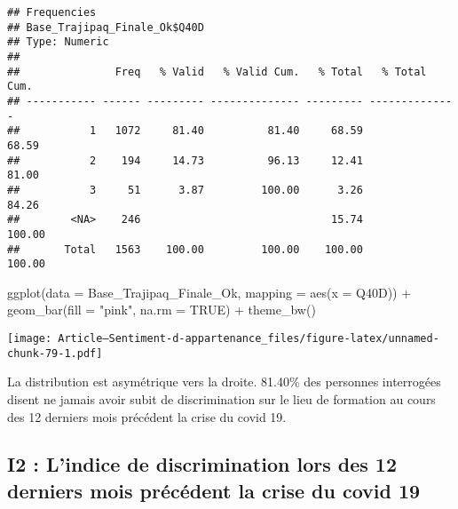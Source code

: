 \documentclass[
]{article}
\newenvironment{Shaded}{\begin{snugshade}}{\end{snugshade}}
\newcommand{\AttributeTok}[1]{\textcolor[rgb]{0.77,0.63,0.00}{#1}}
\newcommand{\ConstantTok}[1]{\textcolor[rgb]{0.00,0.00,0.00}{#1}}
\newcommand{\FunctionTok}[1]{\textcolor[rgb]{0.00,0.00,0.00}{#1}}
\newcommand{\NormalTok}[1]{#1}
\newcommand{\SpecialCharTok}[1]{\textcolor[rgb]{0.00,0.00,0.00}{#1}}
\newcommand{\StringTok}[1]{\textcolor[rgb]{0.31,0.60,0.02}{#1}}
\begin{document}
\begin{Shaded}
\end{Shaded}

\begin{verbatim}
## Frequencies  
## Base_Trajipaq_Finale_Ok$Q40D  
## Type: Numeric  
## 
##               Freq   % Valid   % Valid Cum.   % Total   % Total Cum.
## ----------- ------ --------- -------------- --------- --------------
##           1   1072     81.40          81.40     68.59          68.59
##           2    194     14.73          96.13     12.41          81.00
##           3     51      3.87         100.00      3.26          84.26
##        <NA>    246                              15.74         100.00
##       Total   1563    100.00         100.00    100.00         100.00
\end{verbatim}

\begin{Shaded}
\begin{Highlighting}[]
\FunctionTok{ggplot}\NormalTok{(}\AttributeTok{data =}\NormalTok{ Base\_Trajipaq\_Finale\_Ok, }\AttributeTok{mapping =} \FunctionTok{aes}\NormalTok{(}\AttributeTok{x =}\NormalTok{ Q40D)) }\SpecialCharTok{+}
  \FunctionTok{geom\_bar}\NormalTok{(}\AttributeTok{fill =} \StringTok{"pink"}\NormalTok{, }\AttributeTok{na.rm =} \ConstantTok{TRUE}\NormalTok{) }\SpecialCharTok{+}
  \FunctionTok{theme\_bw}\NormalTok{()}
\end{Highlighting}
\end{Shaded}

\texttt{[image: Article---Sentiment-d-appartenance\_files/figure-latex/unnamed-chunk-79-1.pdf]}

La distribution est asymétrique vers la droite. 81.40\% des personnes
interrogées disent ne jamais avoir subit de discrimination sur le lieu
de formation au cours des 12 derniers mois précédent la crise du covid
19.

\hypertarget{i2-lindice-de-discrimination-lors-des-12-derniers-mois-pruxe9cuxe9dent-la-crise-du-covid-19}{%
\subsection{I2 : L'indice de discrimination lors des 12 derniers mois
précédent la crise du covid
19}\label{i2-lindice-de-discrimination-lors-des-12-derniers-mois-pruxe9cuxe9dent-la-crise-du-covid-19}}
\end{document}
